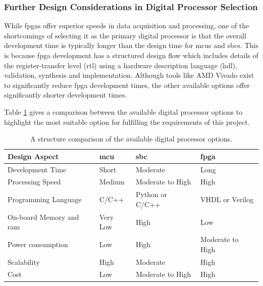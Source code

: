 \documentclass[class=report,11pt,crop=false]{standalone}
\begin{document}
	\subsubsection{Further Design Considerations in Digital Processor Selection}
	
	While \acrshort{fpga}s offer superior speeds in data acquisition and processing, one of the shortcomings of selecting it as the primary digital processor is that the overall development time is typically longer than the design time for \acrshort{mcu}s and \acrshort{sbc}s. This is because \acrshort{fpga} development has a structured design flow which includes details of the register-transfer level (\acrshort{rtl}) using a hardware description language (\acrshort{hdl}), validation, synthesis and implementation. Although tools like AMD Vivado exist to significantly reduce \acrshort{fpga} development times, the other available options offer significantly shorter development times. 
	
	Table \ref{tab:digital-processor-comparison} gives a comparison between the available digital processor options to highlight the most suitable option for fulfilling the requirements of this project. 
	
	\begin{table}[ht!]
		\centering
		\label{tab:digital-processor-comparison}
		\begin{tabular}{|m{8em}|m{10em}|m{10em}|m{10em}|}
			\hline
			\textbf{Design Aspect}	&	\textbf{\acrshort{mcu}}	&	\textbf{\acrshort{sbc}}	&	\textbf{\acrshort{fpga}}\\
			\hline
			Development Time	&	Short	&	Moderate	& 	Long\\
			\hline
			Processing Speed	& 	Medium	&	Moderate to High	& 	High\\
			\hline
			Programming Language	& C/C++ &	Python or C/C++	 & VHDL or Verilog\\
			\hline
			On-board Memory and \acrshort{ram}	& Very Low & High	& Low\\
			\hline
			Power consumption	& Low	& High	& Moderate to High\\
			\hline
			Scalability		& High	& Moderate	& High \\
			\hline
			Cost	& Low	& Moderate to High	& High\\
			\hline	
		\end{tabular}
		\caption{A structure comparison of the available digital processor options.}
	\end{table}
\end{document}
